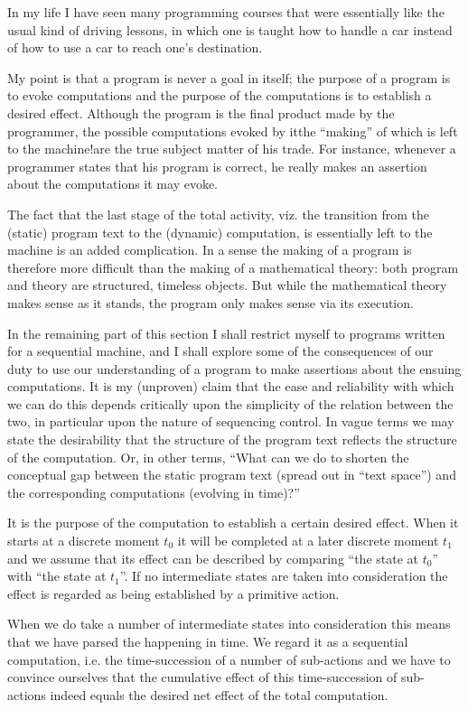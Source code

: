 In my life I have seen many programming courses that were essentially like the usual kind of driving lessons, in which one is taught how to handle a car
instead of how to use a car to reach one's destination.

My point is that a program is never a goal in itself; the purpose of a program is to evoke computations and the purpose of the computations is to establish a desired effect. Although the program is the final product made by the programmer, the possible computations evoked by it\textemdash{}the ``making'' of which is left to the machine!\textemdash{}are the true subject matter of his trade. For instance, whenever a programmer states that his program is correct, he really makes an assertion about the computations it may evoke.

The fact that the last stage of the total activity, viz. the transition from the (static) program text to the (dynamic) computation, is essentially left to the machine is an added complication. In a sense the making of a program is therefore more difficult than the making of a mathematical theory: both program and theory are structured, timeless objects. But while the mathematical theory makes sense as it stands, the program only makes sense via its execution.

In the remaining part of this section I shall restrict myself to programs written for a sequential machine, and I shall explore some of the consequences of our duty to use our understanding of a program to make assertions about the ensuing computations. It is my (unproven) claim that the ease and reliability with which we can do this depends critically upon the simplicity of the relation between the two, in particular upon the nature of sequencing control. In vague terms we may state the desirability that the structure of the program text reflects the structure of the computation. Or, in other terms, ``What can we do to shorten the conceptual gap between the static program
text (spread out in ``text space'') and the corresponding computations (evolving in time)?''

It is the purpose of the computation to establish a certain desired effect. When it starts at a discrete moment $t_0$ it will be completed at a later discrete moment $t_1$ and we assume that its effect can be described by comparing ``the state at $t_0$'' with ``the state at $t_1$''. If no intermediate states are taken into consideration the effect is regarded as being established by a primitive action.

When we do take a number of intermediate states into consideration this means that we have parsed the happening in time. We regard it as a sequential computation, i.e. the time-succession of a number of sub-actions and we have to convince ourselves that the cumulative effect of this time-succession of sub-actions indeed equals the desired net effect of the total computation.

